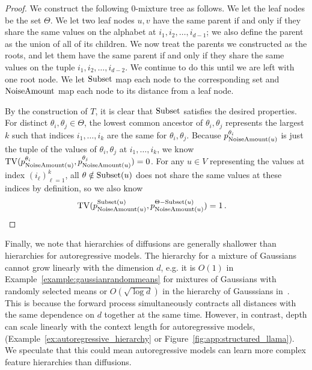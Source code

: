 \begin{proof}
We construct the following $0$-mixture tree as follows. We let the leaf nodes be the set $\Theta$. We let two leaf nodes $u,v$ have the same parent if and only if they share the same values on the alphabet at $i_1,i_2,\dots,i_{d-1}$; we also define the parent as the union of all of its children. We now treat the parents we constructed as the roots, and let them have the same parent if and only if  they share the same values on the tuple $i_1,i_2,\dots,i_{d-2}$. We continue to do this until we are left with one root node. We let $\textrm{Subset}$ map each node to the corresponding set and $\textrm{NoiseAmount}$ map each node to its distance from a leaf node.

By the construction of $T$, it is clear that $\textrm{Subset}$ satisfies the desired properties. For distinct $\theta_i,\theta_j \in \Theta$, the lowest common ancestor of $\theta_i,\theta_j$ represents the largest $k$ such that indices $i_1,\dots,i_k$ are the same for $\theta_i,\theta_j$. Because $p^{\theta_i}_{\textrm{NoiseAmount}(u)}$ is just the tuple of the values of $\theta_i,\theta_j$ at $i_1,\dots,i_k$, we know $\mathrm{TV}(p^{\theta_i}_{\textrm{NoiseAmount}(u)},p^{\theta_j}_{\textrm{NoiseAmount}(u)}) = 0 $. For any $u \in V$ representing the values at index $(i_\ell)_{\ell=1}^k$, all $\theta \notin \textrm{Subset}(u)$ does not share the same values at these indices by definition, so we also know \begin{align}\mathrm{TV}(p^{\textrm{Subset}(u)}_{\textrm{NoiseAmount}(u)},p^{\Theta-\textrm{Subset}(u)}_{\textrm{NoiseAmount}(u)}) &=1\,.\qedhere\end{align}
\end{proof}
Finally, we note that hierarchies of diffusions are generally shallower than hierarchies for autoregressive models. The hierarchy for a mixture of Gaussians cannot grow linearly with the dimension $d$, e.g. it is $O(1)$ in Example~\ref{example:gaussianrandommeans} for mixtures of Gaussians with randomly selected means or $O(\sqrt{\log d})$ in the hierarchy of Gausssians in~\citep{li2024criticalwindowsnonasymptotictheory}. This is because the forward process simultaneously contracts all distances with the same dependence on $d$ together at the same time. However, in contrast, depth can scale linearly with the context length for autoregressive models, (Example~\ref{ex:autoregressive_hierarchy} or Figure~\ref{fig:app:structured_llama}). We speculate that this could mean autoregressive models can learn more complex feature hierarchies than diffusions.